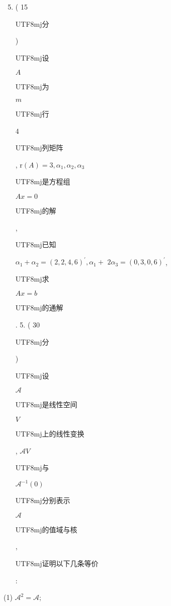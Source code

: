 \documentclass[10pt]{article}
\begin{document}
\begin{enumerate}
  \setcounter{enumi}{4}
  \item ( 15 \begin{CJK}{UTF8}{mj}分\end{CJK}) \begin{CJK}{UTF8}{mj}设\end{CJK} $A$ \begin{CJK}{UTF8}{mj}为\end{CJK} $m$ \begin{CJK}{UTF8}{mj}行\end{CJK} 4 \begin{CJK}{UTF8}{mj}列矩阵\end{CJK}, $\mathrm{r}(A)=3, \alpha_{1}, \alpha_{2}, \alpha_{3}$ \begin{CJK}{UTF8}{mj}是方程组\end{CJK} $A x=0$ \begin{CJK}{UTF8}{mj}的解\end{CJK}, \begin{CJK}{UTF8}{mj}已知\end{CJK} $\alpha_{1}+\alpha_{2}=(2,2,4,6)^{\prime}, \alpha_{1}+$ $2 \alpha_{3}=(0,3,0,6)^{\prime}$, \begin{CJK}{UTF8}{mj}求\end{CJK} $A x=b$ \begin{CJK}{UTF8}{mj}的通解\end{CJK}. 5. ( 30 \begin{CJK}{UTF8}{mj}分\end{CJK}) \begin{CJK}{UTF8}{mj}设\end{CJK} $\mathscr{A}$ \begin{CJK}{UTF8}{mj}是线性空间\end{CJK} $V$ \begin{CJK}{UTF8}{mj}上的线性变换\end{CJK}, $\mathscr{A} V$ \begin{CJK}{UTF8}{mj}与\end{CJK} $\mathscr{A}^{-1}(0)$ \begin{CJK}{UTF8}{mj}分别表示\end{CJK} $\mathscr{A}$ \begin{CJK}{UTF8}{mj}的值域与核\end{CJK}, \begin{CJK}{UTF8}{mj}证明以下几条等价\end{CJK}:
\end{enumerate}
(1) $\mathscr{A}^{2}=\mathscr{A}$;
\end{document}

